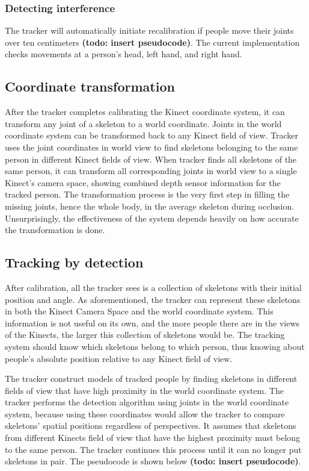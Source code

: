 \documentclass{sigchi}
\begin{document}
\subsubsection{Detecting interference}

The tracker will automatically initiate recalibration if people move their joints over ten centimeters \textbf{(todo: insert pseudocode)}. The current implementation checks movements at a person's head, left hand, and right hand.

\subsection{Coordinate transformation}

After the tracker completes calibrating the Kinect coordinate system, it can transform any joint of a skeleton to a world coordinate. Joints in the world coordinate system can be transformed back to any Kinect field of view. Tracker uses the joint coordinates in world view to find skeletons belonging to the same person in different Kinect fields of view. When tracker finds all skeletons of the same person, it can transform all corresponding joints in world view to a single Kinect's camera space, showing combined depth sensor information for the tracked person. The transformation process is the very first step in filling the missing joints, hence the whole body, in the average skeleton during occlusion. Unsurprisingly, the effectiveness of the system depends heavily on how accurate the transformation is done.

\subsection{Tracking by detection}

After calibration, all the tracker sees is a collection of skeletons with their initial position and angle. As aforementioned, the tracker can represent these skeletons in both the Kinect Camera Space and the world coordinate system. This information is not useful on its own, and the more people there are in the views of the Kinects, the larger this collection of skeletons would be. The tracking system should know which skeletons belong to which person, thus knowing about people's absolute position relative to any Kinect field of view.

The tracker construct models of tracked people by finding skeletons in different fields of view that have high proximity in the world coordinate system. The tracker performs the detection algorithm using joints in the world coordinate system, because using these coordinates would allow the tracker to compare skeletons' spatial positions regardless of perspectives. It assumes that skeletons from different Kinects field of view that have the highest proximity must belong to the same person. The tracker continues this process until it can no longer put skeletons in pair. The pseudocode is shown below \textbf{(todo: insert pseudocode)}.
\end{document}
